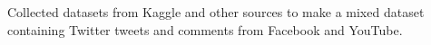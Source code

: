 Collected datasets from Kaggle and other sources to make a mixed dataset containing Twitter tweets and comments from Facebook and YouTube. 